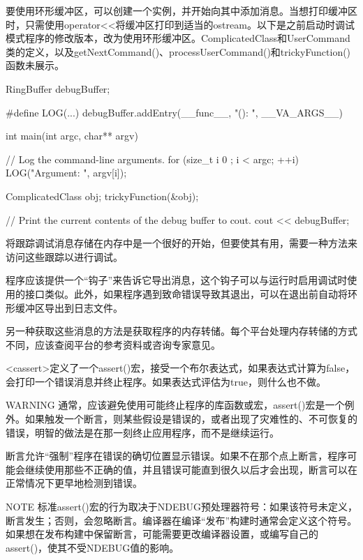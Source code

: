 
要使用环形缓冲区，可以创建一个实例，并开始向其中添加消息。当想打印缓冲区时，只需使用operator<{}<将缓冲区打印到适当的ostream。以下是之前启动时调试模式程序的修改版本，改为使用环形缓冲区。ComplicatedClass和UserCommand类的定义，以及getNextCommand()、processUserCommand()和trickyFunction()函数未展示。

\begin{cpp}
RingBuffer debugBuffer;

#define LOG(...) debugBuffer.addEntry(__func__, "(): ", __VA_ARGS__)

int main(int argc, char** argv)
{
    // Log the command-line arguments.
    for (size_t i { 0 }; i < argc; ++i) {
        LOG("Argument: ", argv[i]);
    }

    ComplicatedClass obj;
    trickyFunction(&obj);

    // Print the current contents of the debug buffer to cout.
    cout << debugBuffer;
}
\end{cpp}


将跟踪调试消息存储在内存中是一个很好的开始，但要使其有用，需要一种方法来访问这些跟踪以进行调试。

程序应该提供一个“钩子”来告诉它导出消息，这个钩子可以与运行时启用调试时使用的接口类似。此外，如果程序遇到致命错误导致其退出，可以在退出前自动将环形缓冲区导出到日志文件。

另一种获取这些消息的方法是获取程序的内存转储。每个平台处理内存转储的方式不同，应该查阅平台的参考资料或咨询专家意见。


<cassert>定义了一个assert()宏，接受一个布尔表达式，如果表达式计算为false，会打印一个错误消息并终止程序。如果表达式评估为true，则什么也不做。

\begin{myWarning}{WARNING}
通常，应该避免使用可能终止程序的库函数或宏，assert()宏是一个例外。如果触发一个断言，则某些假设是错误的，或者出现了灾难性的、不可恢复的错误，明智的做法是在那一刻终止应用程序，而不是继续运行。
\end{myWarning}

断言允许“强制”程序在错误的确切位置显示错误。如果不在那个点上断言，程序可能会继续使用那些不正确的值，并且错误可能直到很久以后才会出现，断言可以在正常情况下更早地检测到错误。

\begin{myNotic}{NOTE}
标准assert()宏的行为取决于NDEBUG预处理器符号：如果该符号未定义，断言发生；否则，会忽略断言。编译器在编译“发布”构建时通常会定义这个符号。如果想在发布构建中保留断言，可能需要更改编译器设置，或编写自己的assert()，使其不受NDEBUG值的影响。
\end{myNotic}

